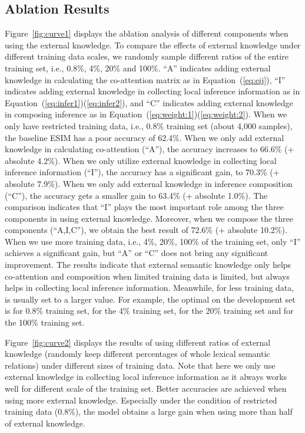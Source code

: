 \documentclass[11pt,a4paper]{article}
\begin{document}
\subsection{Ablation Results}
Figure~\ref{fig:curve1} displays the ablation analysis of different components when using the external knowledge. To compare the effects of external knowledge under different training data scales, we randomly sample different ratios of the entire training set, i.e., 0.8\%, 4\%, 20\% and 100\%. ``A'' indicates adding external knowledge in calculating the co-attention matrix as in Equation~(\ref{eq:eij}), ``I'' indicates adding external knowledge in collecting local inference information as in Equation~(\ref{eq:infer1})(\ref{eq:infer2}), and ``C'' indicates adding external knowledge in composing inference as in Equation~(\ref{eq:weight:1})(\ref{eq:weight:2}). When we only have restricted training data, i.e., 0.8\% training set (about 4,000 samples), the baseline ESIM has a poor accuracy of 62.4\%. When we only add external knowledge in calculating co-attention (``A''), the accuracy increases to 66.6\% (+ absolute 4.2\%). When we only utilize external knowledge in collecting local inference information (``I''), the accuracy has a significant gain, to 70.3\% (+ absolute 7.9\%). When we only add external knowledge in inference composition (``C''), the accuracy gets a smaller gain to 63.4\% (+ absolute 1.0\%). The comparison indicates that ``I'' plays the most important role among the three components in using external knowledge. Moreover, when we compose the three components (``A,I,C''), we obtain the best result of 72.6\% (+ absolute 10.2\%). When we use more training data, i.e., 4\%, 20\%, 100\% of the training set, only ``I'' achieves a significant gain, but ``A'' or ``C'' does not bring any significant improvement. The results indicate that external semantic knowledge only helps co-attention and composition when limited training data is limited, but always helps in collecting local inference information. Meanwhile, for less training data,  is usually set to a larger value. For example, the optimal  on the development set is  for 0.8\% training set,  for the 4\% training set,  for the 20\% training set and  for the 100\% training set.

Figure~\ref{fig:curve2} displays the results of using different ratios of external knowledge (randomly keep different percentages of whole lexical semantic relations) under different sizes of training data. Note that here we only use external knowledge in collecting local inference information as it always works well for different scale of the training set. Better accuracies are achieved when using more external knowledge. Especially under the condition of restricted training data (0.8\%), the model obtains a large gain when using more than half of external knowledge.
\end{document}
